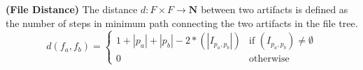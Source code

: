 \begin{definition} {\bf (File Distance)} 
	The distance $d : F \times F \rightarrow \mathbf{N} $ between two artifacts is defined as the number of steps in minimum path connecting the two artifacts in the file tree.
	\label{definition:artifact-distance}
	\[
	d(f_a,f_b) = 
	\begin{cases}
	
	1 + |p_a| + |p_b| - 2*(|I_{p_a,p_b}|) & \text{if $(I_{p_a,p_b}) \neq \emptyset $} \\
	0 & \text{otherwise}
	
	\end{cases}
	\]	
\end{definition}

